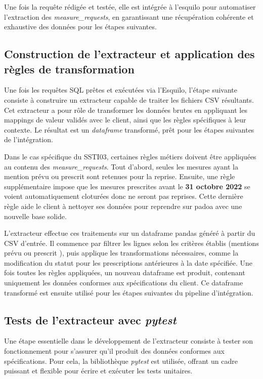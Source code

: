 Une fois la requête rédigée et testée, elle est intégrée à l’esquilo pour automatiser l’extraction des \textit{measure\_requests}, en garantissant une récupération cohérente et exhaustive des données pour les étapes suivantes.


\subsection{Construction de l’extracteur et application des règles de transformation}

Une fois les requêtes SQL prêtes et exécutées via l’Esquilo, l’étape suivante consiste à construire un extracteur capable de traiter les fichiers CSV résultants. Cet extracteur a pour rôle de transformer les données brutes en appliquant les mappings de valeur validés avec le client, ainsi que les règles spécifiques à leur contexte. Le résultat est un \textit{dataframe} transformé, prêt pour les étapes suivantes de l’intégration.

Dans le cas spécifique du SSTI03, certaines règles métiers doivent être appliquées au contenu des \textit{measure\_requests}. Tout d’abord, seules les mesures ayant la mention \og prévu \fg{} ou \og prescrit \fg{} sont retenues pour la reprise. Ensuite, une règle supplémentaire impose que les mesures prescrites avant le \textbf{31 octobre 2022} se voient automatiquement cloturées donc ne seront pas reprises. Cette dernière règle aide le client à nettoyer ses données pour reprendre sur padoa avec une nouvelle base solide.

L’extracteur effectue ces traitements sur un dataframe pandas généré à partir du CSV d’entrée. Il commence par filtrer les lignes selon les critères établis (mentions \og prévu \fg{} ou \og prescrit \fg{}), puis applique les transformations nécessaires, comme la modification du statut pour les prescriptions antérieures à la date spécifiée. Une fois toutes les règles appliquées, un nouveau dataframe est produit, contenant uniquement les données conformes aux spécifications du client. Ce dataframe transformé est ensuite utilisé pour les étapes suivantes du pipeline d’intégration.

\subsection{Tests de l’extracteur avec \textit{pytest}}

Une étape essentielle dans le développement de l’extracteur consiste à tester son fonctionnement pour s’assurer qu’il produit des données conformes aux spécifications. Pour cela, la bibliothèque \textit{pytest} est utilisée, offrant un cadre puissant et flexible pour écrire et exécuter les tests unitaires.

